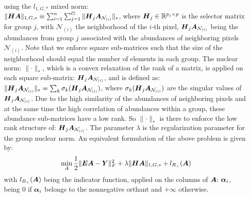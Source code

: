 \documentclass{article}
\begin{document}
\\ using the $l_{1,G,*}$ mixed norm: \\ $\|  \mbox{\boldmath$H$}\mbox{\boldmath$A$} \|_{1,G,*} \equiv \sum_{i=1}^n{\sum_{j = 1}^{G}{\|\mbox{\boldmath$H$}_j\mbox{\boldmath$A$}_{\mathcal{N}_{(i)}}}\|_*} $, where $\mbox{\boldmath$H$}_j \in \mathbb{R}^{p_j \times p}$ is the selector matrix for group $j$, with $\mathcal{N}_{(i)}$ the neighborhood of the $i$-th pixel,  $\mbox{\boldmath$H$}_j\mbox{\boldmath$A$}_{\mathcal{N}_{(i)}}$  being the abundances from group $j$ associated with the abundances of neighboring pixels $\mathcal{N}_{(i)}$. Note that we enforce square sub-matrices such that the size of the neighborhood should equal the number of elements in each group. The nuclear norm: $\| \mathord{\cdot} \|_*$,  which is a convex relaxation of the rank of a matrix, is applied on each square sub-matrix: $\mbox{\boldmath$H$}_j\mbox{\boldmath$A$}_{\mathcal{N}_{(i)}}$, and is defined as: $\| \mbox{\boldmath$H$}_j\mbox{\boldmath$A$}_{\mathcal{N}_{(i)}} \|_* = \sum_{k}{\sigma_k(\mbox{\boldmath$H$}_j\mbox{\boldmath$A$}_{\mathcal{N}_{(i)}})}$, where $\sigma_k(\mbox{\boldmath$H$}_j\mbox{\boldmath$A$}_{\mathcal{N}_{(i)}})$  are the singular values of $\mbox{\boldmath$H$}_j\mbox{\boldmath$A$}_{\mathcal{N}_{(i)}}$.
Due to the high similarity of the abundances of neighboring pixels and at the same time the high correlation of abundances within a group, these abundance sub-matrices have a low rank. So $\| \mathord{\cdot} \|_*$   
is there to enforce the low rank structure of: $ \mbox{\boldmath$H$}_j\mbox{\boldmath$A$}_{\mathcal{N}_{(i)}}$. 
The parameter $\lambda$ is the regularization parameter for the group nuclear norm. An equivalent formulation of the above problem is given by: 
\begin{gather}
\label{eqn:obj}
\min_{A} \frac{1}{2} \| \mbox{\boldmath$E$} \mbox{\boldmath$A$} -\mbox{\boldmath$Y$} \|_F^2 +\lambda\| \mbox{\boldmath$H$}\mbox{\boldmath$A$} \|_{1,G,*}  + l_{R_+}{(\mbox{\boldmath$A$})}
\end{gather}
with $l_{R_+}{(\mbox{\boldmath$A$})}$ being the indicator function, applied on the columns of $\mbox{\boldmath$A$}$: $\mbox{\boldmath$\alpha$}_i$, being 0 if $\mbox{\boldmath$\alpha$}_i$ belongs to the nonnegative orthant and $+\infty$ otherwise.
\end{document}
